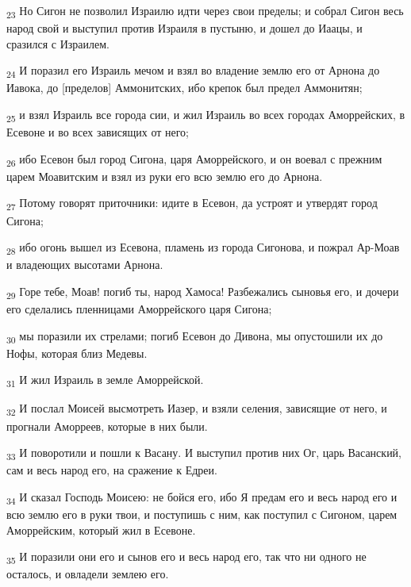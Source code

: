 \begin{tcolorbox}
\textsubscript{23} Но Сигон не позволил Израилю идти через свои пределы; и собрал Сигон весь народ свой и выступил против Израиля в пустыню, и дошел до Иаацы, и сразился с Израилем.
\end{tcolorbox}
\begin{tcolorbox}
\textsubscript{24} И поразил его Израиль мечом и взял во владение землю его от Арнона до Иавока, до [пределов] Аммонитских, ибо крепок был предел Аммонитян;
\end{tcolorbox}
\begin{tcolorbox}
\textsubscript{25} и взял Израиль все города сии, и жил Израиль во всех городах Аморрейских, в Есевоне и во всех зависящих от него;
\end{tcolorbox}
\begin{tcolorbox}
\textsubscript{26} ибо Есевон был город Сигона, царя Аморрейского, и он воевал с прежним царем Моавитским и взял из руки его всю землю его до Арнона.
\end{tcolorbox}
\begin{tcolorbox}
\textsubscript{27} Потому говорят приточники: идите в Есевон, да устроят и утвердят город Сигона;
\end{tcolorbox}
\begin{tcolorbox}
\textsubscript{28} ибо огонь вышел из Есевона, пламень из города Сигонова, и пожрал Ар-Моав и владеющих высотами Арнона.
\end{tcolorbox}
\begin{tcolorbox}
\textsubscript{29} Горе тебе, Моав! погиб ты, народ Хамоса! Разбежались сыновья его, и дочери его сделались пленницами Аморрейского царя Сигона;
\end{tcolorbox}
\begin{tcolorbox}
\textsubscript{30} мы поразили их стрелами; погиб Есевон до Дивона, мы опустошили их до Нофы, которая близ Медевы.
\end{tcolorbox}
\begin{tcolorbox}
\textsubscript{31} И жил Израиль в земле Аморрейской.
\end{tcolorbox}
\begin{tcolorbox}
\textsubscript{32} И послал Моисей высмотреть Иазер, и взяли селения, зависящие от него, и прогнали Аморреев, которые в них были.
\end{tcolorbox}
\begin{tcolorbox}
\textsubscript{33} И поворотили и пошли к Васану. И выступил против них Ог, царь Васанский, сам и весь народ его, на сражение к Едреи.
\end{tcolorbox}
\begin{tcolorbox}
\textsubscript{34} И сказал Господь Моисею: не бойся его, ибо Я предам его и весь народ его и всю землю его в руки твои, и поступишь с ним, как поступил с Сигоном, царем Аморрейским, который жил в Есевоне.
\end{tcolorbox}
\begin{tcolorbox}
\textsubscript{35} И поразили они его и сынов его и весь народ его, так что ни одного не осталось, и овладели землею его.
\end{tcolorbox}
